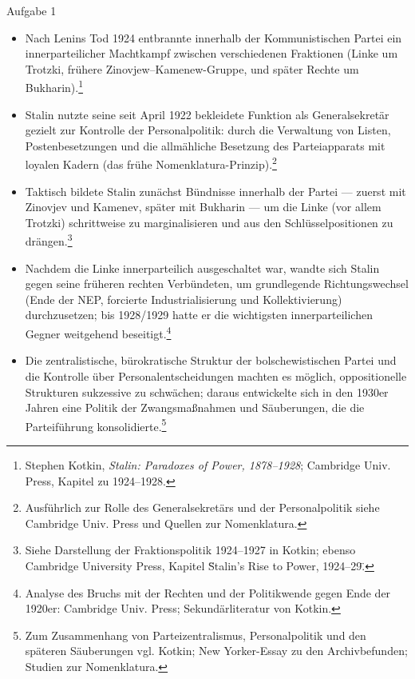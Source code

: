 \documentclass[11pt,a4paper,oneside]{article}
\begin{document}
	\begin{histloesung}{Aufgabe 1}
			\begin{itemize}
			\item Nach Lenins Tod 1924 entbrannte innerhalb der Kommunistischen Partei ein innerparteilicher Machtkampf zwischen verschiedenen Fraktionen (Linke um Trotzki, frühere Zinovjew–Kamenew-Gruppe, und später Rechte um Bukharin).\footnote{Stephen Kotkin, \textit{Stalin: Paradoxes of Power, 1878–1928}; Cambridge Univ. Press, Kapitel zu 1924–1928.}
			\item Stalin nutzte seine seit April 1922 bekleidete Funktion als Generalsekretär gezielt zur Kontrolle der Personalpolitik: durch die Verwaltung von Listen, Postenbesetzungen und die allmähliche Besetzung des Parteiapparats mit loyalen Kadern (das frühe Nomenklatura-Prinzip).\footnote{Ausführlich zur Rolle des Generalsekretärs und der Personalpolitik siehe Cambridge Univ. Press und Quellen zur Nomenklatura.}
			\item Taktisch bildete Stalin zunächst Bündnisse innerhalb der Partei — zuerst mit Zinovjev und Kamenev, später mit Bukharin — um die Linke (vor allem Trotzki) schrittweise zu marginalisieren und aus den Schlüsselpositionen zu drängen.\footnote{Siehe Darstellung der Fraktionspolitik 1924–1927 in Kotkin; ebenso Cambridge University Press, Kapitel \"Stalin's Rise to Power, 1924–29\".}
			\item Nachdem die Linke innerparteilich ausgeschaltet war, wandte sich Stalin gegen seine früheren rechten Verbündeten, um grundlegende Richtungswechsel (Ende der NEP, forcierte Industrialisierung und Kollektivierung) durchzusetzen; bis 1928/1929 hatte er die wichtigsten innerparteilichen Gegner weitgehend beseitigt.\footnote{Analyse des Bruchs mit der Rechten und der Politikwende gegen Ende der 1920er: Cambridge Univ. Press; Sekundärliteratur von Kotkin.}
			\item Die zentralistische, bürokratische Struktur der bolschewistischen Partei und die Kontrolle über Personalentscheidungen machten es möglich, oppositionelle Strukturen sukzessive zu schwächen; daraus entwickelte sich in den 1930er Jahren eine Politik der Zwangsmaßnahmen und Säuberungen, die die Parteiführung konsolidierte.\footnote{Zum Zusammenhang von Parteizentralismus, Personalpolitik und den späteren Säuberungen vgl. Kotkin; New Yorker-Essay zu den Archivbefunden; Studien zur Nomenklatura.}
		\end{itemize}
	\end{histloesung}
	
\end{document}

